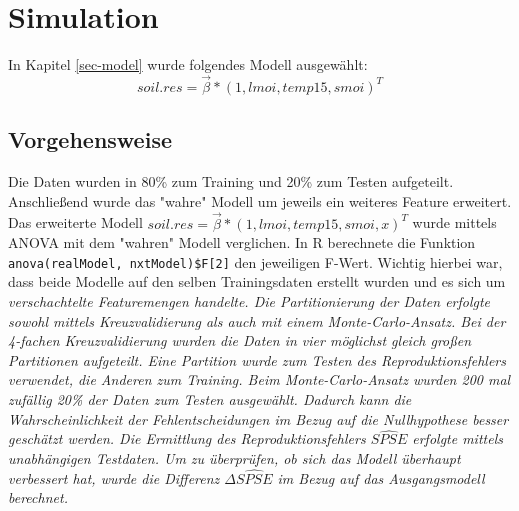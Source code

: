 \section{Simulation}
In Kapitel \ref{sec-model} wurde folgendes Modell ausgewählt:
\begin{equation}
	soil.res = \vec{\beta} * (1,lmoi,temp15,smoi)^T
\end{equation}

\subsection{Vorgehensweise}
Die Daten wurden in 80\% zum Training und 20\% zum Testen aufgeteilt.
Anschließend wurde das "wahre" Modell um jeweils ein weiteres Feature erweitert.
Das erweiterte Modell $soil.res = \vec{\beta} * (1,lmoi,temp15,smoi,x)^T$ wurde mittels ANOVA mit dem "wahren" Modell verglichen.
In R berechnete die Funktion \lstinline|anova(realModel, nxtModel)$F[2]| den jeweiligen F-Wert.
Wichtig hierbei war, dass beide Modelle auf den selben Trainingsdaten erstellt wurden und es sich um \it{verschachtelte} Featuremengen handelte.
Die Partitionierung der Daten erfolgte sowohl mittels Kreuzvalidierung als auch mit einem Monte-Carlo-Ansatz.
Bei der 4-fachen Kreuzvalidierung wurden die Daten in vier möglichst gleich großen Partitionen aufgeteilt.
Eine Partition wurde zum Testen des Reproduktionsfehlers verwendet, die Anderen zum Training.
Beim Monte-Carlo-Ansatz wurden 200 mal zufällig 20\% der Daten zum Testen ausgewählt.
Dadurch kann die Wahrscheinlichkeit der Fehlentscheidungen im Bezug auf die Nullhypothese besser geschätzt werden.
Die Ermittlung des Reproduktionsfehlers $\widehat{SPSE}$ erfolgte mittels unabhängigen Testdaten.
Um zu überprüfen, ob sich das Modell überhaupt verbessert hat, wurde die Differenz $\Delta \widehat{SPSE}$ im Bezug auf das Ausgangsmodell berechnet.

